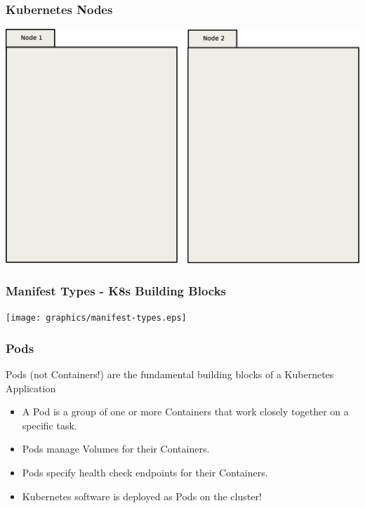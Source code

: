     \begin{frame}
        \frametitle{Kubernetes Nodes}
        \includegraphics[width=\textwidth,height=0.85\textheight,keepaspectratio]{graphics/00-nodes.eps}
    \end{frame}

    \begin{frame}
        \frametitle{Manifest Types - K8s Building Blocks}
        \texttt{[image: graphics/manifest-types.eps]}
    \end{frame}

    \begin{frame}
        \frametitle{Pods}
        Pods (not Containers!) are the fundamental building blocks of a Kubernetes Application\pause
        \begin{itemize}
            \item A Pod is a group of one or more Containers that work closely together on a specific task.\pause
            \item Pods manage Volumes for their Containers.\pause
            \item Pods specify health check endpoints for their Containers.\pause
            \item Kubernetes software is deployed as Pods on the cluster!
        \end{itemize}
    \end{frame}

